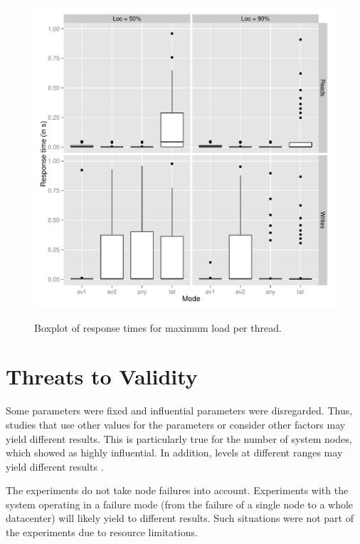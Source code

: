 \documentclass[doublespacing]{bmcart}
\begin{document}
\begin{figure}[h!]
\caption{Boxplot of response times for maximum load per thread.}
\includegraphics[width=1.0\textwidth]{boxplot200_max.png}
\label{fig:boxplot_dos_tempos_de_resposta_para_carga_maxima}
\end{figure}

\section{Threats to Validity}

Some parameters were fixed and influential parameters were disregarded.  Thus,
studies that use other values for the parameters or consider other factors may
yield different results. This is particularly true for the number of system
nodes, which showed as highly influential.  In addition, levels at different ranges
may yield different results \cite{Jain1991}.

The experiments do not take node failures into account.  Experiments with the
system operating in a failure mode (from the failure of a single node to a whole
datacenter) will likely yield to different results. Such situations were not part of the experiments due to resource limitations.

\end{document}
